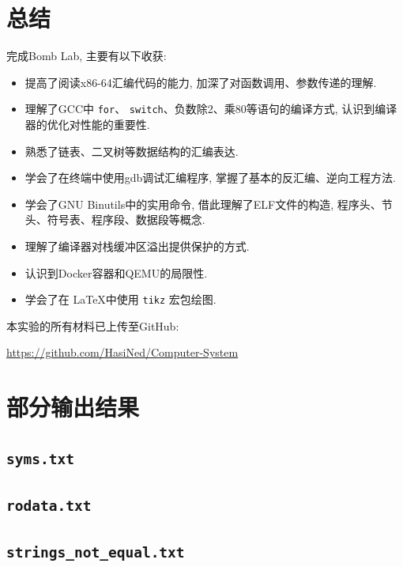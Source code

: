 \clearpage
\section{总结}

完成Bomb Lab, 主要有以下收获:

\begin{itemize}
    \item 提高了阅读x86-64汇编代码的能力, 加深了对函数调用、参数传递的理解.
    \item 理解了GCC中 \verb|for|、 \verb|switch|、负数除2、乘80等语句的编译方式, 认识到编译器的优化对性能的重要性. 
    \item 熟悉了链表、二叉树等数据结构的汇编表达.
    \item 学会了在终端中使用gdb调试汇编程序, 掌握了基本的反汇编、逆向工程方法.
    \item 学会了GNU Binutils中的实用命令, 借此理解了ELF文件的构造, 程序头、节头、符号表、程序段、数据段等概念.
    \item 理解了编译器对栈缓冲区溢出提供保护的方式.
    \item 认识到Docker容器和QEMU的局限性.
    \item 学会了在 \LaTeX 中使用 \verb|tikz| 宏包绘图.
\end{itemize}

本实验的所有材料已上传至GitHub:

\url{https://github.com/HasiNed/Computer-System}

\setupappendix

\clearpage
\section{部分输出结果}

\subsection{\texttt{syms.txt}}\label{syms}


\subsection{\texttt{rodata.txt}}\label{rodata}


\subsection{\texttt{strings_not_equal.txt}}\label{strings-not-equal}

